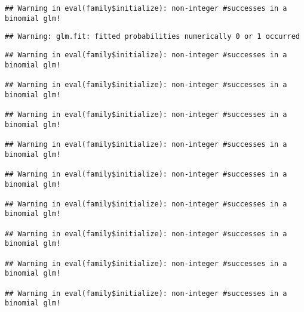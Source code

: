 \documentclass[
]{article}
\newenvironment{Shaded}{\begin{snugshade}}{\end{snugshade}}
\newcommand{\AttributeTok}[1]{\textcolor[rgb]{0.77,0.63,0.00}{#1}}
\newcommand{\CommentTok}[1]{\textcolor[rgb]{0.56,0.35,0.01}{\textit{#1}}}
\newcommand{\DecValTok}[1]{\textcolor[rgb]{0.00,0.00,0.81}{#1}}
\newcommand{\FloatTok}[1]{\textcolor[rgb]{0.00,0.00,0.81}{#1}}
\newcommand{\FunctionTok}[1]{\textcolor[rgb]{0.00,0.00,0.00}{#1}}
\newcommand{\NormalTok}[1]{#1}
\newcommand{\OtherTok}[1]{\textcolor[rgb]{0.56,0.35,0.01}{#1}}
\newcommand{\SpecialCharTok}[1]{\textcolor[rgb]{0.00,0.00,0.00}{#1}}
\newcommand{\StringTok}[1]{\textcolor[rgb]{0.31,0.60,0.02}{#1}}
\begin{document}
\begin{Shaded}
\end{Shaded}

\begin{verbatim}
## Warning in eval(family$initialize): non-integer #successes in a binomial glm!
\end{verbatim}

\begin{verbatim}
## Warning: glm.fit: fitted probabilities numerically 0 or 1 occurred
\end{verbatim}

\begin{verbatim}
## Warning in eval(family$initialize): non-integer #successes in a binomial glm!

## Warning in eval(family$initialize): non-integer #successes in a binomial glm!

## Warning in eval(family$initialize): non-integer #successes in a binomial glm!

## Warning in eval(family$initialize): non-integer #successes in a binomial glm!

## Warning in eval(family$initialize): non-integer #successes in a binomial glm!

## Warning in eval(family$initialize): non-integer #successes in a binomial glm!

## Warning in eval(family$initialize): non-integer #successes in a binomial glm!

## Warning in eval(family$initialize): non-integer #successes in a binomial glm!

## Warning in eval(family$initialize): non-integer #successes in a binomial glm!
\end{verbatim}
\end{document}

